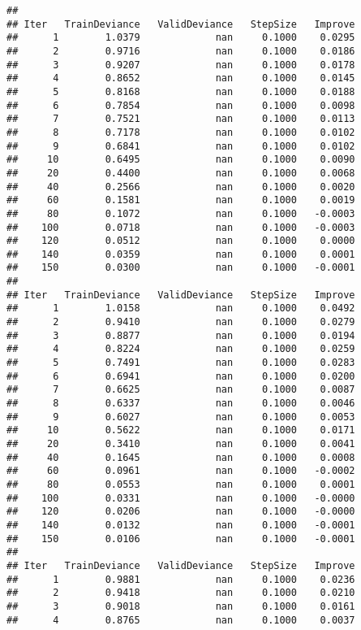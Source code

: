 \documentclass[]{article}
\begin{document}
\begin{verbatim}
## 
## Iter   TrainDeviance   ValidDeviance   StepSize   Improve
##      1        1.0379             nan     0.1000    0.0295
##      2        0.9716             nan     0.1000    0.0186
##      3        0.9207             nan     0.1000    0.0178
##      4        0.8652             nan     0.1000    0.0145
##      5        0.8168             nan     0.1000    0.0188
##      6        0.7854             nan     0.1000    0.0098
##      7        0.7521             nan     0.1000    0.0113
##      8        0.7178             nan     0.1000    0.0102
##      9        0.6841             nan     0.1000    0.0102
##     10        0.6495             nan     0.1000    0.0090
##     20        0.4400             nan     0.1000    0.0068
##     40        0.2566             nan     0.1000    0.0020
##     60        0.1581             nan     0.1000    0.0019
##     80        0.1072             nan     0.1000   -0.0003
##    100        0.0718             nan     0.1000   -0.0003
##    120        0.0512             nan     0.1000    0.0000
##    140        0.0359             nan     0.1000    0.0001
##    150        0.0300             nan     0.1000   -0.0001
## 
## Iter   TrainDeviance   ValidDeviance   StepSize   Improve
##      1        1.0158             nan     0.1000    0.0492
##      2        0.9410             nan     0.1000    0.0279
##      3        0.8877             nan     0.1000    0.0194
##      4        0.8224             nan     0.1000    0.0259
##      5        0.7491             nan     0.1000    0.0283
##      6        0.6941             nan     0.1000    0.0200
##      7        0.6625             nan     0.1000    0.0087
##      8        0.6337             nan     0.1000    0.0046
##      9        0.6027             nan     0.1000    0.0053
##     10        0.5622             nan     0.1000    0.0171
##     20        0.3410             nan     0.1000    0.0041
##     40        0.1645             nan     0.1000    0.0008
##     60        0.0961             nan     0.1000   -0.0002
##     80        0.0553             nan     0.1000    0.0001
##    100        0.0331             nan     0.1000   -0.0000
##    120        0.0206             nan     0.1000   -0.0000
##    140        0.0132             nan     0.1000   -0.0001
##    150        0.0106             nan     0.1000   -0.0001
## 
## Iter   TrainDeviance   ValidDeviance   StepSize   Improve
##      1        0.9881             nan     0.1000    0.0236
##      2        0.9418             nan     0.1000    0.0210
##      3        0.9018             nan     0.1000    0.0161
##      4        0.8765             nan     0.1000    0.0037

\end{verbatim}
\end{document}
